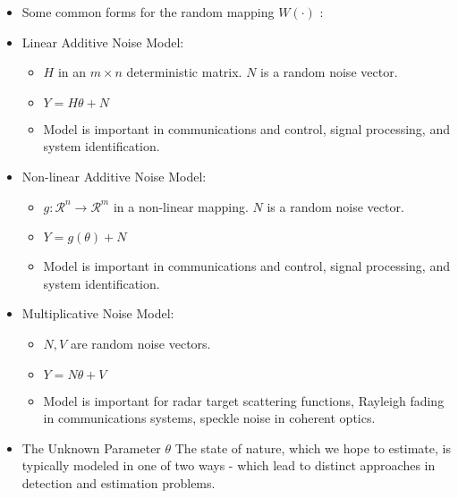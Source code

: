 \documentclass[12pt,thmsa]{article}
\begin{document}
\begin{itemize}
	\item Some common forms for the random mapping $W(\cdot)$ :
	\item Linear Additive Noise Model:



	\begin{itemize}
		\item $H$ in an $m \times n$ deterministic matrix. $N$ is a random noise vector.


		\item $ Y=H \theta+N$


		\item Model is important in communications and control, signal processing, and system identification.
	\end{itemize}
\end{itemize}

\begin{itemize}
	\item Non-linear Additive Noise Model:


	\begin{itemize}
		\item $g: \mathcal{R}^{n} \rightarrow \mathcal{R}^{m}$ in a non-linear mapping. $N$ is a random noise vector.
	
		\item $Y=g(\theta)+N$
	
		\item Model is important in communications and control, signal processing, and system identification.
	\end{itemize}

\end{itemize}

\begin{itemize}
	\item Multiplicative Noise Model:

	\begin{itemize}
		\item $N, V$ are random noise vectors.

		\item $Y=N \theta+V$

		\item Model is important for radar target scattering functions, Rayleigh fading in communications systems, speckle noise in coherent optics.
	\end{itemize}
\end{itemize}

\begin{itemize}
	\item The Unknown Parameter $\theta$ The state of nature, which we hope to estimate, is typically modeled in one of two ways - which lead to distinct approaches in detection and estimation problems.
\end{itemize}
\end{document}
